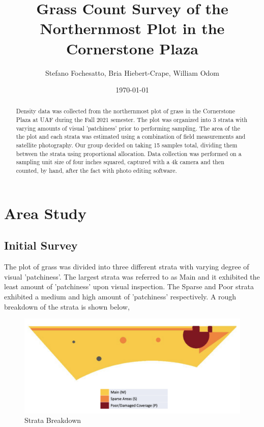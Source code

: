 \documentclass[12pt]{amsart}
\title{Grass Count Survey of the Northernmost Plot in the Cornerstone Plaza}
\author{Stefano Fochesatto, Bria Hiebert-Crape, William Odom}
\date{\today} %
\begin{document}
\begin{abstract}
    Density data was collected from the northernmost plot of grass in the Cornerstone Plaza at UAF during the Fall 2021 semester. 
    The plot was organized into 3 strata with varying amounts of visual 'patchiness' prior to performing sampling. The area of the the plot and each strata was 
    estimated using a combination of field measurements and satellite photography. Our group decided on taking 15 samples total, dividing them between 
    the strata using proportional allocation. Data collection was performed on a sampling unit size of 
    four inches squared, captured with a 4k camera and then counted, by hand, after the fact with photo editing software.

\end{abstract}

\doublespacing %


\maketitle

\section*{Area Study}%
\subsection*{Initial Survey}
The plot of grass was divided into three different strata with varying degree of visual 'patchiness'. The largest strata was referred to as Main
and it exhibited the least amount of 'patchiness' upon visual inspection. The Sparse and Poor strata exhibited a medium and high amount of 'patchiness'
respectively. A rough breakdown of the strata is shown below, 
\begin{figure}[H]
    \begin{center}
    \caption{Strata Breakdown}
    \includegraphics[width=\linewidth]{fig1.png}
    \end{center}
    \end{figure}
\end{document}
